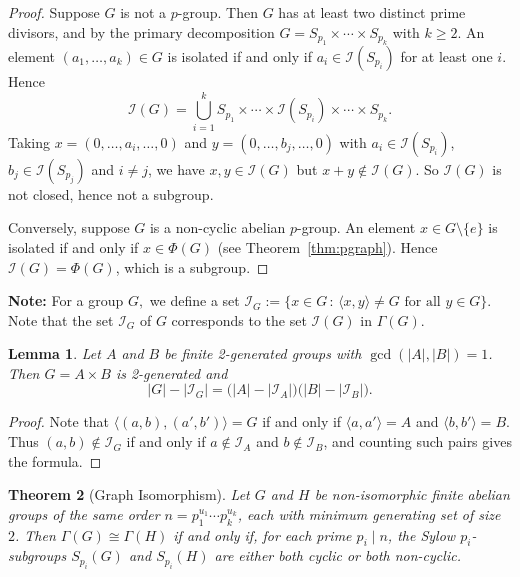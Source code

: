 \documentclass[11pt]{article}
\def \I {{\mathcal I}}
\newtheorem{theorem}{Theorem}[section]
\newtheorem{lemma}[theorem]{Lemma}
\begin{document}
    \begin{proof}
      Suppose $G$ is not a $p$-group. Then $G$ has at least 
        two distinct prime divisors, and by the primary decomposition 
        $G = S_{p_1} \times \cdots \times S_{p_k}$ with $k \geq 2$. An 
        element $(a_1,\ldots,a_k) \in G$ is isolated if and only if 
        $a_i \in \I(S_{p_i})$ for at least one $i$. Hence 
        $$\I(G) = \bigcup_{i=1}^{k} S_{p_1} \times \cdots \times 
        \I(S_{p_i}) \times \cdots \times S_{p_k}.$$
        Taking $x = (0,\ldots, a_i, \ldots, 0)$ and 
        $y = (0,\ldots, b_j,\ldots, 0)$ with $a_i \in \I(S_{p_i})$, 
        $b_j \in \I(S_{p_j})$ and $i \neq j$, we have $x, y \in \I(G)$ 
        but $x + y \notin \I(G)$. So $\I(G)$ is not closed, hence not 
        a subgroup.
    
    Conversely, suppose $G$ is a non-cyclic abelian $p$-group. An element $x \in G\setminus\{e\}$ is isolated if 
        and only if $x \in \Phi(G)$ (see Theorem~\ref{thm:pgraph}).  Hence $\I(G) = \Phi(G)$, which is a subgroup.
    \end{proof}   

\textbf{Note:} For a group $G,$ we define a set $\I_G:=\{x\in G\,:\,\langle x,y\rangle\neq G \text{ for all } y\in G\}.$ Note that the set $\I_G$ of $G$ corresponds to the set $\I(G)$ in $\Gamma(G).$
\begin{lemma}
        Let $A$ and $B$ be finite 2-generated groups with $\gcd(|A|, |B|) = 1$. 
        Then $G=A \times B$ is 2-generated and
        $$|G| - |{\I}_G| = \bigl(|A| - |{\I}_A|\bigr)
        \bigl(|B| - |{\I}_B|\bigr).$$     
\end{lemma}
\begin{proof}
Note that $\langle (a,b),(a',b')\rangle = G$ if and only if $\langle a,a'\rangle = A$ 
and $\langle b,b'\rangle = B$. Thus $(a,b) \notin {\I}_G$ if and 
only if $a \notin {\I}_A$ and $b \notin {\I}_B$, and counting 
such pairs gives the formula.
\end{proof}

    \begin{theorem}[Graph Isomorphism]\label{thm:isom}
        Let $G$ and $H$ be non-isomorphic finite abelian groups of the same order 
        $n = p_1^{u_1} \cdots p_k^{u_k}$, each with minimum generating set of 
        size $2$. Then $\Gamma(G) \cong \Gamma(H)$ if and only if, for each prime 
        $p_i \mid n$, the Sylow $p_i$-subgroups $S_{p_i}(G)$ and $S_{p_i}(H)$ 
        are either both cyclic or both non-cyclic.
        \end{theorem}
\end{document}
